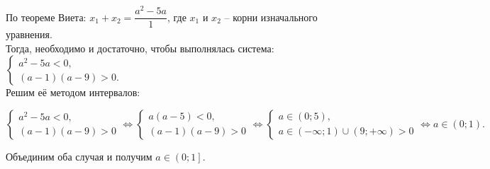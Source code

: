 По теореме Виета: $x_1+x_2=\dfrac{a^2-5a}{1}$, где $x_1$ и  $x_2$ -- корни изначального уравнения.\\
Тогда, необходимо и достаточно, чтобы выполнялась система: $\left\{
\begin{array}{l}
a^2-5a<0,\\
(a-1)(a-9)>0.
\end{array} \right.$\\
Решим её методом интервалов:\\
\begin{center}$
\left\{ \begin{array}{l}
a^2-5a<0,\\
(a-1)(a-9)>0
\end{array} \right. \Leftrightarrow
\left\{ \begin{array}{l}
a(a-5)<0,\\
(a-1)(a-9)>0
\end{array} \right. \Leftrightarrow
\left\{ \begin{array}{l}
a\in(0;5),\\
a\in(-\infty;1)\cup(9;+\infty)>0
\end{array} \right. \Leftrightarrow a\in\left(0;1\right).
$\end{center}
Объединим оба случая и получим $a\in\left(0;1 \right]$.\\
\Answer{$a\in\left(0;1 \right]$}
